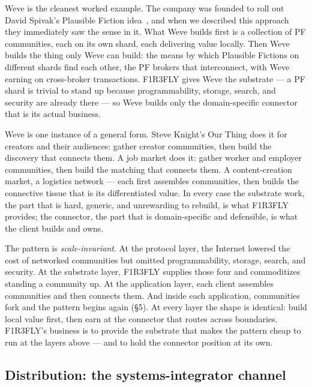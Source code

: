 \documentclass[11pt]{article}
\begin{document}
Weve is the cleanest worked example. The company was founded to roll out David Spivak's Plausible Fiction idea~\cite{pf,pricedPf}, and when we described this approach they immediately saw the sense in it. What Weve builds first is a collection of PF communities, each on its own shard, each delivering value locally. Then Weve builds the thing only Weve can build: the means by which Plausible Fictions on different shards find each other, the PF brokers that interconnect, with Weve earning on cross-broker transactions. F1R3FLY gives Weve the substrate --- a PF shard is trivial to stand up because programmability, storage, search, and security are already there --- so Weve builds only the domain-specific connector that is its actual business.

Weve is one instance of a general form. Steve Knight's Our Thing does it for creators and their audiences: gather creator communities, then build the discovery that connects them. A job market does it: gather worker and employer communities, then build the matching that connects them. A content-creation market, a logistics network --- each first assembles communities, then builds the connective tissue that is its differentiated value. In every case the substrate work, the part that is hard, generic, and unrewarding to rebuild, is what F1R3FLY provides; the connector, the part that is domain-specific and defensible, is what the client builds and owns.

\begin{keybox}
The pattern is \emph{scale-invariant}. At the protocol layer, the Internet lowered the cost of networked communities but omitted programmability, storage, search, and security. At the substrate layer, F1R3FLY supplies those four and commoditizes standing a community up. At the application layer, each client assembles communities and then connects them. And inside each application, communities fork and the pattern begins again (\S5). At every layer the shape is identical: build local value first, then earn at the connector that routes across boundaries. F1R3FLY's business is to provide the substrate that makes the pattern cheap to run at the layers above --- and to hold the connector position at its own.
\end{keybox}

\subsection*{Distribution: the systems-integrator channel}
\end{document}
